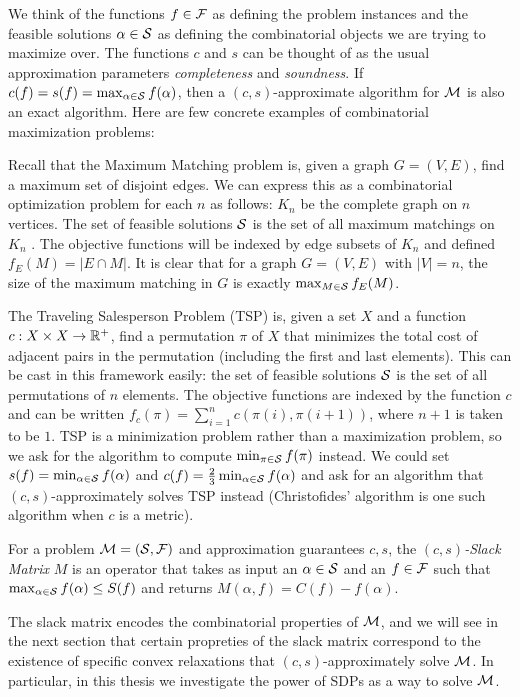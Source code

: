 We think of the functions $f \in \mathcal F$ as defining the problem instances and the feasible solutions $\alpha \in \mathcal S$ as defining the combinatorial objects we are
trying to maximize over. The functions $c$ and $s$ can be thought of as the usual approximation parameters \emph{completeness} and \emph{soundness}. If $c(f) = s(f) = \max_{\alpha \in \mathcal S} f(\alpha)$, then a $(c,s)$-approximate algorithm for $\mathcal M$ is also an exact algorithm. Here are few concrete examples of combinatorial maximization problems:
\begin{example} 
    Recall that the Maximum Matching problem is, given a graph $G = (V,E)$, find a maximum set of disjoint edges. We can express this as a combinatorial optimization problem for each $n$ as follows: $K_n$ be the complete graph on $n$ vertices. The set of feasible solutions $\mathcal S$ is the set of all maximum matchings on $K_n$ . The objective functions will be indexed by edge subsets of $K_n$ and defined $f_E(M) = |E \cap M|$. It is clear that for a graph $G = (V, E)$ with $|V| = n$, the size of the maximum matching in $G$ is exactly $\max_{M \in \mathcal S} f_E(M)$.
\end{example}
\begin{example}
The Traveling Salesperson Problem (\textsc{TSP}) is, given a set $X$ and a function $c: X\times X \rightarrow \mathbb R^+$, find a permutation $\pi$ of $X$ that minimizes the total cost of adjacent pairs in the permutation (including the first and last elements). This can be cast in this framework easily: the set of feasible solutions $\mathcal S$ is the set of all permutations of $n$ elements. The objective functions are indexed by the function $c$ and can be written $f_c(\pi) = \sum_{i=1}^n c(\pi(i),\pi(i+1))$, where $n+1$ is taken to be $1$. TSP is a minimization problem rather than a maximization problem, so we ask for the algorithm to compute $\min_{\pi \in \mathcal S} f(\pi)$ instead. We could set $s(f) = \min_{\alpha \in \mathcal S} f(\alpha)$ and $c(f) = \frac{2}{3}\min_{\alpha \in \mathcal S} f(\alpha)$ and ask for an algorithm that $(c,s)$-approximately solves \textsc{TSP} instead (Christofides' algorithm \cite{Chri76} is one such algorithm when $c$ is a metric).
\end{example}
\begin{definition}
    For a problem $\mathcal M = (\mathcal S, \mathcal F)$ and approximation guarantees $c,s$, the \emph{$(c,s)$-Slack Matrix} $M$ is an operator that takes as input an $\alpha \in \mathcal S$ and an $f \in \mathcal F$ such that $\max_{\alpha \in \mathcal S} f(\alpha) \leq S(f)$ and returns $M(\alpha,f) = C(f) - f(\alpha)$. 
\end{definition}
The slack matrix encodes the  combinatorial properties of $\mathcal M$, and we will see in the next section that certain propreties of the slack matrix correspond to the existence of specific convex relaxations that $(c,s)$-approximately solve $\mathcal M$. In particular, in this thesis we investigate the power of SDPs as a way to solve $\mathcal M$. 

